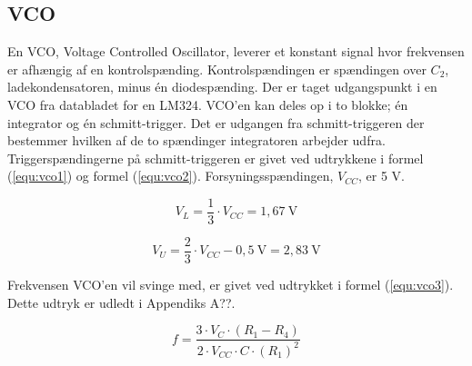 \subsection*{VCO}
\label{volumenkontrol-design-vco}

En VCO, Voltage Controlled Oscillator, leverer et konstant signal hvor frekvensen er afhængig af en kontrolspænding. Kontrolspændingen er spændingen over $C_2$, ladekondensatoren, minus én diodespænding. Der er taget udgangspunkt i en VCO fra databladet for en LM324. VCO'en kan deles op i to blokke; én integrator og én schmitt-trigger. Det er udgangen fra schmitt-triggeren der bestemmer hvilken af de to spændinger integratoren arbejder udfra. Triggerspændingerne på schmitt-triggeren er givet ved udtrykkene i formel (\ref{equ:vco1}) og formel (\ref{equ:vco2}). Forsyningsspændingen, $V_{CC}$, er 5 V.

\begin{equation}
\label{equ:vco1}
V_L = \frac{1}{3} \cdot V_{CC} = 1,67~\mathrm{V}
\end{equation}

\begin{equation}
\label{equ:vco2}
V_U = \frac{2}{3} \cdot V_{CC} - 0,5~\mathrm{V} = 2,83~\mathrm{V}
\end{equation}

Frekvensen VCO'en vil svinge med, er givet ved udtrykket i formel (\ref{equ:vco3}). Dette udtryk er udledt i Appendiks A??.

\begin{equation}
\label{equ:vco3}
f = \frac{3 \cdot V_C \cdot (R_1 - R_4)}{2 \cdot V_{CC} \cdot C \cdot (R_1)^2}
\end{equation}

